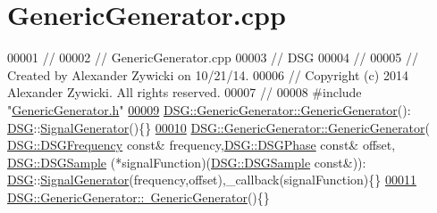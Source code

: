 \hypertarget{_generic_generator_8cpp_source}{\section{Generic\+Generator.\+cpp}
\label{_generic_generator_8cpp_source}
}

\begin{DoxyCode}
00001 \textcolor{comment}{//}
00002 \textcolor{comment}{//  GenericGenerator.cpp}
00003 \textcolor{comment}{//  DSG}
00004 \textcolor{comment}{//}
00005 \textcolor{comment}{//  Created by Alexander Zywicki on 10/21/14.}
00006 \textcolor{comment}{//  Copyright (c) 2014 Alexander Zywicki. All rights reserved.}
00007 \textcolor{comment}{//}
00008 \textcolor{preprocessor}{#include "\hyperlink{_generic_generator_8h}{GenericGenerator.h}"}
\hypertarget{_generic_generator_8cpp_source_l00009}{}\hyperlink{class_d_s_g_1_1_generic_generator_a560df325ce43fa9a1baf4463ccaed2d3}{00009} \hyperlink{class_d_s_g_1_1_generic_generator_a560df325ce43fa9a1baf4463ccaed2d3}{DSG::GenericGenerator::GenericGenerator}():
      \hyperlink{namespace_d_s_g}{DSG}::\hyperlink{class_d_s_g_1_1_signal_generator}{SignalGenerator}()\{\}
\hypertarget{_generic_generator_8cpp_source_l00010}{}\hyperlink{class_d_s_g_1_1_generic_generator_a1dbab25aa71cb7bce7e4b02be5122244}{00010} \hyperlink{class_d_s_g_1_1_generic_generator_a560df325ce43fa9a1baf4463ccaed2d3}{DSG::GenericGenerator::GenericGenerator}(
      \hyperlink{namespace_d_s_g_a4315a061386fa1014fda09b15d3a6973}{DSG::DSGFrequency} \textcolor{keyword}{const}& frequency,\hyperlink{namespace_d_s_g_a44431ce1eb0a7300efdd207bc879e52c}{DSG::DSGPhase} \textcolor{keyword}{const}& offset,
      \hyperlink{namespace_d_s_g_ac39a94cd27ebcd9c1e7502d0c624894a}{DSG::DSGSample} (*signalFunction)(\hyperlink{namespace_d_s_g_ac39a94cd27ebcd9c1e7502d0c624894a}{DSG::DSGSample} \textcolor{keyword}{const}&)):
      \hyperlink{namespace_d_s_g}{DSG}::\hyperlink{class_d_s_g_1_1_signal_generator}{SignalGenerator}(frequency,offset),\_callback(signalFunction)\{\}
\hypertarget{_generic_generator_8cpp_source_l00011}{}\hyperlink{class_d_s_g_1_1_generic_generator_aeaca1efdba7186a8b3b1879b092e7bec}{00011} \hyperlink{class_d_s_g_1_1_generic_generator_aeaca1efdba7186a8b3b1879b092e7bec}{DSG::GenericGenerator::~GenericGenerator}()\{\}
\end{DoxyCode}

